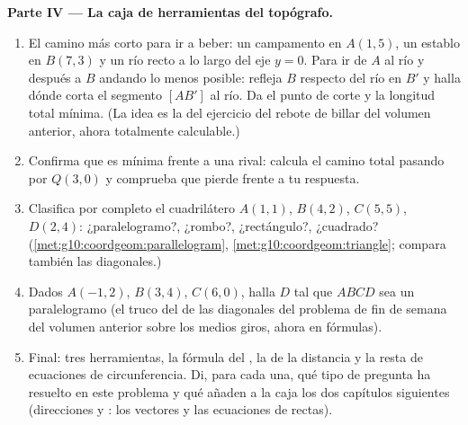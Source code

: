 \begin{problem}
\medskip
\noindent\textbf{Parte IV --- La caja de herramientas del topógrafo.}
\begin{enumerate}[resume]
  \item El camino más corto para ir a beber: un campamento en $A(1, 5)$,
        un establo en $B(7, 3)$ y un río recto a lo largo del eje $y = 0$.
        Para ir de $A$ al río y después a $B$ andando lo menos posible:
        refleja $B$ respecto del río en $B'$ y halla dónde corta el
        segmento $[AB']$ al río. Da el punto de corte y la longitud total
        mínima. (La idea es la del ejercicio del rebote de billar del
        volumen anterior, ahora totalmente calculable.)
  \item Confirma que es mínima frente a una rival: calcula el camino total
        pasando por $Q(3, 0)$ y comprueba que pierde frente a tu
        respuesta.
  \item Clasifica por completo el cuadrilátero $A(1,1)$, $B(4,2)$,
        $C(5,5)$, $D(2,4)$: ¿paralelogramo?, ¿rombo?, ¿rectángulo?,
        ¿cuadrado? (\cref{met:g10:coordgeom:parallelogram},
        \cref{met:g10:coordgeom:triangle}; compara también las
        diagonales.)
  \item Dados $A(-1, 2)$, $B(3, 4)$, $C(6, 0)$, halla $D$ tal que $ABCD$
        sea un paralelogramo (el truco del  de las diagonales
        del problema de fin de semana del volumen anterior sobre los medios
        giros, ahora en fórmulas).
  \item Final: tres herramientas, la fórmula del , la de la
        distancia y la resta de ecuaciones de circunferencia. Di, para
        cada una, qué tipo de pregunta ha resuelto en este problema y qué
        añaden a la caja los dos capítulos siguientes (direcciones y
        : los vectores y las ecuaciones de rectas).
\end{enumerate}
\end{problem}
